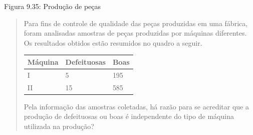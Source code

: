 Figura 9.35: Produção de peças
\begin{quote}

Para fins de controle de qualidade das peças produzidas em uma fábrica, foram analisadas amostras de peças produzidas por máquinas diferentes. Os resultados obtidos estão resumidos no quadro a seguir.


\begin{savenotes}\sphinxattablestart
\centering
\begin{tabulary}{\linewidth}[t]{|T|T|T|}
\hline

Máquina
&
Defeituosas
&
Boas
\\
\hline
I
&
5
&
195
\\
\hline
II
&
15
&
585
\\
\hline
\end{tabulary}
\par
\sphinxattableend\end{savenotes}

Pela informação das amostras coletadas, há razão para se acreditar que a produção de defeituosas ou boas é independente do tipo de máquina utilizada na produção?
\end{quote}
